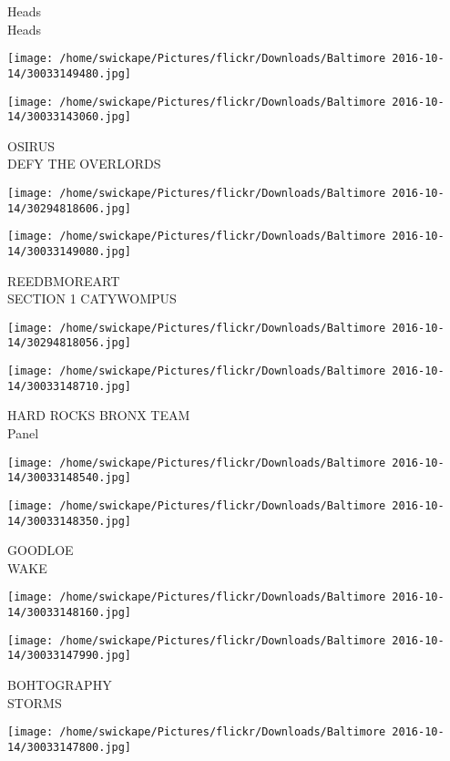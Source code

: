 \documentclass[10pt,letterpaper]{article}
\begin{document}
Heads\\
Heads
\pagebreak

\texttt{[image: /home/swickape/Pictures/flickr/Downloads/Baltimore 2016-10-14/30033149480.jpg]}

\vspace{0.25in}
\texttt{[image: /home/swickape/Pictures/flickr/Downloads/Baltimore 2016-10-14/30033143060.jpg]}

OSIRUS\\
DEFY THE OVERLORDS
\pagebreak

\texttt{[image: /home/swickape/Pictures/flickr/Downloads/Baltimore 2016-10-14/30294818606.jpg]}

\vspace{0.25in}
\texttt{[image: /home/swickape/Pictures/flickr/Downloads/Baltimore 2016-10-14/30033149080.jpg]}

REEDBMOREART\\
SECTION 1 CATYWOMPUS
\pagebreak

\texttt{[image: /home/swickape/Pictures/flickr/Downloads/Baltimore 2016-10-14/30294818056.jpg]}

\vspace{0.25in}
\texttt{[image: /home/swickape/Pictures/flickr/Downloads/Baltimore 2016-10-14/30033148710.jpg]}

HARD ROCKS BRONX TEAM\\
Panel
\pagebreak

\texttt{[image: /home/swickape/Pictures/flickr/Downloads/Baltimore 2016-10-14/30033148540.jpg]}

\vspace{0.25in}
\texttt{[image: /home/swickape/Pictures/flickr/Downloads/Baltimore 2016-10-14/30033148350.jpg]}

GOODLOE\\
WAKE
\pagebreak

\texttt{[image: /home/swickape/Pictures/flickr/Downloads/Baltimore 2016-10-14/30033148160.jpg]}

\vspace{0.25in}
\texttt{[image: /home/swickape/Pictures/flickr/Downloads/Baltimore 2016-10-14/30033147990.jpg]}

BOHTOGRAPHY\\
STORMS
\pagebreak

\texttt{[image: /home/swickape/Pictures/flickr/Downloads/Baltimore 2016-10-14/30033147800.jpg]}
\end{document}
